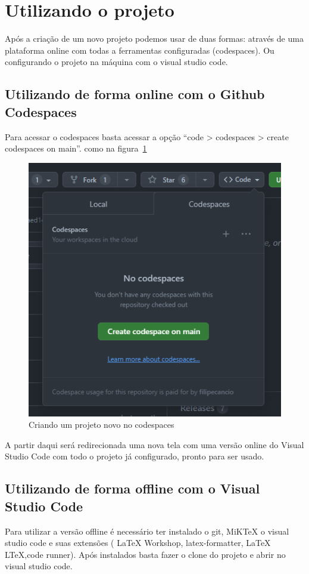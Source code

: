 \section{Utilizando o projeto}

Após a criação de um novo projeto podemos usar de duas formas: através de uma plataforma online com todas a ferramentas configuradas (codespaces). Ou configurando o projeto na máquina com o visual studio code.


\subsection{Utilizando de forma online com o Github Codespaces}

Para acessar o codespaces basta acessar a opção ``code > codespaces > create codespaces on main''. como na figura~\ref{fig:image04}

\begin{figure}[ht]
	\centering
	\includegraphics[width=.5\textwidth]{./images/image04.png}
	\caption{Criando um projeto novo no codespaces}
	\label{fig:image04}
\end{figure}

A partir daqui será redirecionada uma nova tela com uma versão online do Visual Studio Code com todo o projeto já configurado, pronto para ser usado.

\subsection{Utilizando de forma offline com o Visual Studio Code}

Para utilizar a versão offline é necessário ter instalado o git, MiKTeX o visual studio code e suas extensões (
LaTeX Workshop, latex-formatter, LaTeX LTeX,code runner). Após instalados basta fazer o clone do projeto e abrir no visual studio code.


